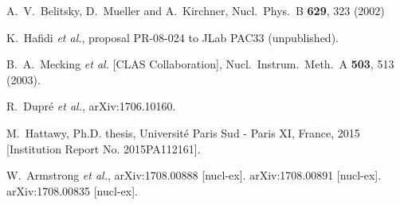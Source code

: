 \documentclass[twocolumn,nofootinbib,showpacs,prl,superscriptaddress,secnumarabic,amssymb,nobibnotes,aps,floatfix]{revtex4}
\begin{document}
\begin{thebibliography}{99}
A.~V.~Belitsky, D.~Mueller and A.~Kirchner,
Nucl.\ Phys.\ B {\bf 629}, 323 (2002)


 K.~Hafidi {\it et al.},
   proposal PR-08-024 to JLab PAC33 (unpublished).

 B.~A.~Mecking {\it et al.} [CLAS Collaboration],
   Nucl.\ Instrum.\ Meth.\ A {\bf 503}, 513 (2003).

 R.~Dupr\'e {\it et al.},
  arXiv:1706.10160.

M.~Hattawy, Ph.D. thesis, Universit{\'e} Paris Sud - Paris XI, France, 2015 
[Institution Report No. 2015PA112161].

 W.~Armstrong {\it et al.},
     arXiv:1708.00888 [nucl-ex].
       arXiv:1708.00891 [nucl-ex].
         arXiv:1708.00835 [nucl-ex].





\end{thebibliography}
\end{document}
